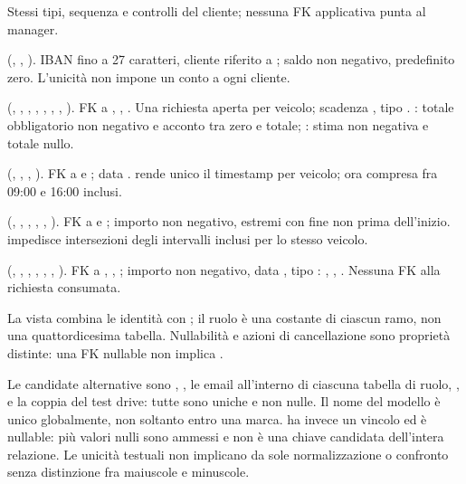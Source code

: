\begin{description}[style=nextline,leftmargin=1em]
Stessi tipi, sequenza e controlli del cliente; nessuna FK applicativa punta al manager.
\item[\code{bank_account}]
(, , ).
IBAN fino a 27 caratteri, cliente riferito a ; saldo non negativo, predefinito zero. L'unicità non impone un conto a ogni cliente.
\item[\code{request}]
(, , , , , , , ).
FK a , , . Una richiesta aperta per veicolo; scadenza , tipo . : totale obbligatorio non negativo e acconto tra zero e totale; : stima non negativa e totale nullo.
\item[\code{test_drive}]
(, , , ).
FK a  e ; data .  rende unico il timestamp per veicolo; ora compresa fra 09:00 e 16:00 inclusi.
\item[\code{rent}]
(, , , , , ).
FK a  e ; importo non negativo, estremi  con fine non prima dell'inizio.  impedisce intersezioni degli intervalli inclusi per lo stesso veicolo.
\item[\code{sale}]
(, , , , , , ).
FK a , , ; importo non negativo, data , tipo : , , . Nessuna FK alla richiesta consumata.
\end{description}
La vista  combina le
identità con ; il ruolo è una costante di ciascun ramo,
non una quattordicesima tabella. Nullabilità e azioni di cancellazione sono
proprietà distinte: una FK nullable non implica .

Le candidate alternative sono , ,
le email all'interno di ciascuna tabella di ruolo,
,  e la coppia
 del test drive: tutte sono uniche e non nulle.
Il nome del modello è unico globalmente, non soltanto entro una marca.
 ha invece un vincolo  ed è
nullable: più valori nulli sono ammessi e non è una chiave candidata
dell'intera relazione. Le unicità testuali non implicano da sole
normalizzazione o confronto senza distinzione fra maiuscole e minuscole.

